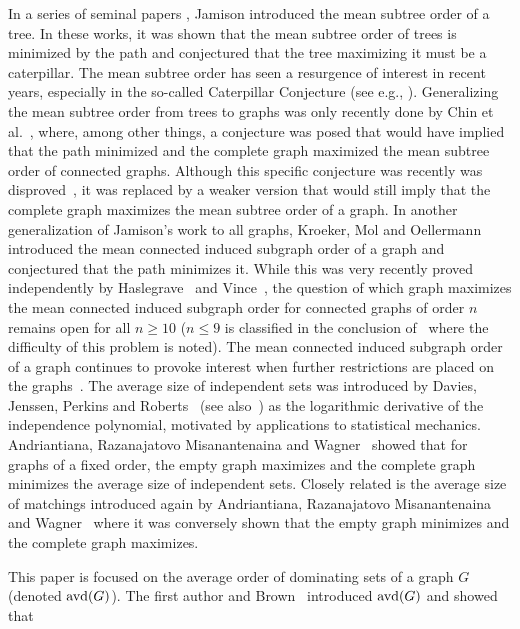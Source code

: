 \documentclass[11pt]{article}
\newcommand{\avd}{\text{\rm{avd}}}
\begin{document}
In a series of seminal papers \cite{1983Jamison,1984Jamison}, Jamison introduced the mean subtree order of a tree. In these works, it was shown that the mean subtree order of trees is minimized by the path and conjectured that the tree maximizing it must be a caterpillar. The mean subtree order has seen a resurgence of interest in recent years, especially in the so-called Caterpillar Conjecture (see e.g., \cite{2019Mol, 2015Wagner, 2021Cambie, 2010Vince}). Generalizing the mean subtree order from trees to graphs was only recently done by Chin et al.~\cite{2018ChinGordonMacpheeVincent}, where, among other things, a conjecture was posed that would have implied that the path minimized and the complete graph maximized the mean subtree order of connected graphs.  Although this specific conjecture was recently was disproved~\cite{2021Cameron}, it was replaced by a weaker version that would still imply that the complete graph maximizes the mean subtree order of a graph. In another generalization of Jamison's work to all graphs, Kroeker, Mol and Oellermann~\cite{2018Kroeker} introduced the mean connected induced subgraph order of a graph and conjectured that the path minimizes it. While this was very recently proved independently by Haslegrave~\cite{2022Haslegrave_pathminimizes} and Vince~\cite{2022Vince}, the question of which graph maximizes the mean connected induced subgraph order for connected graphs of order $n$ remains open for all $n\ge 10$ ($n\le 9$ is classified in the conclusion of~\cite{2018Kroeker} where the difficulty of this problem is noted). The mean connected induced subgraph order of a graph continues to provoke interest when further restrictions are placed on the graphs~\cite{2020Balodis, 2022Haslegrave_withdegconstraints}. The average size of independent sets was introduced by Davies, Jenssen, Perkins and Roberts~\cite{2017Davies} (see also~\cite{2018Davies}) as the logarithmic derivative of the independence polynomial, motivated by applications to statistical mechanics. Andriantiana, Razanajatovo Misanantenaina and Wagner~\cite{2020Andriantiana_indep} showed that for graphs of a fixed order, the empty graph maximizes and the complete graph minimizes the average size of independent sets. Closely related is the average size of matchings introduced again by Andriantiana, Razanajatovo Misanantenaina and Wagner~\cite{2020Andriantiana_matchings} where it was conversely shown that the empty graph minimizes and the complete graph maximizes.

This paper is focused on the average order of dominating sets of a graph $G$ (denoted $\avd(G)$). The first author and Brown~\cite{2021Beaton} introduced $\avd(G)$ and showed that 
\end{document}
